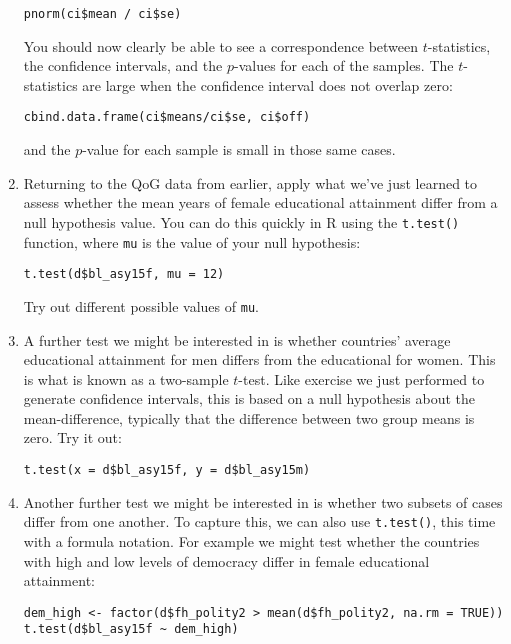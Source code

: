\documentclass[a4paper,12pt]{article}
\begin{document}
\begin{enumerate}
\begin{verbatim}
pnorm(ci$mean / ci$se)
\end{verbatim}

\noindent You should now clearly be able to see a correspondence between $t$-statistics, the confidence intervals, and the $p$-values for each of the samples. The $t$-statistics are large when the confidence interval does not overlap zero:

\begin{verbatim}
cbind.data.frame(ci$means/ci$se, ci$off)
\end{verbatim}

\noindent and the $p$-value for each sample is small in those same cases.


\item Returning to the QoG data from earlier, apply what we've just learned to assess whether the mean years of female educational attainment differ from a null hypothesis value. You can do this quickly in R using the \texttt{t.test()} function, where \texttt{mu} is the value of your null hypothesis:

\begin{verbatim}
t.test(d$bl_asy15f, mu = 12)
\end{verbatim}

\noindent Try out different possible values of \texttt{mu}.

\item A further test we might be interested in is whether countries' average educational attainment for men differs from the educational for women. This is what is known as a two-sample $t$-test. Like exercise we just performed to generate confidence intervals, this is based on a null hypothesis about the mean-difference, typically that the difference between two group means is zero. Try it out:

\begin{verbatim}
t.test(x = d$bl_asy15f, y = d$bl_asy15m)
\end{verbatim}

\item Another further test we might be interested in is whether two subsets of cases differ from one another. To capture this, we can also use \texttt{t.test()}, this time with a formula notation. For example we might test whether the countries with high and low levels of democracy differ in female educational attainment:

\begin{verbatim}
dem_high <- factor(d$fh_polity2 > mean(d$fh_polity2, na.rm = TRUE))
t.test(d$bl_asy15f ~ dem_high)
\end{verbatim}


\end{enumerate}
\end{document}
